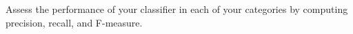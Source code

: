 Assess the performance of your classifier in each of your
categories by computing precision, recall, and F-measure.